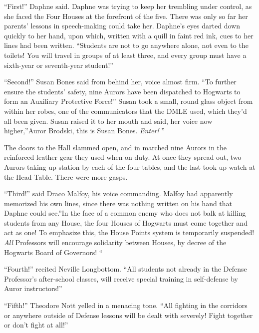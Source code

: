 ``First!'' Daphne said. Daphne was trying to keep her trembling under
control, as she faced the Four Houses at the forefront of the five.
There was only so far her parents' lessons in speech-making could take
her. Daphne's eyes darted down quickly to her hand, upon which, written
with a quill in faint red ink, cues to her lines had been written.
``Students are not to go anywhere alone, not even to the toilets! You
will travel in groups of at least three, and every group must have a
sixth-year or seventh-year student!''

``Second!'' Susan Bones said from behind her, voice almost firm. ``To
further ensure the students' safety, nine Aurors have been dispatched to
Hogwarts to form an Auxiliary Protective Force!'' Susan took a small,
round glass object from within her robes, one of the communicators that
the DMLE used, which they'd all been given. Susan raised it to her mouth
and said, her voice now higher,''Auror Brodski, this is Susan Bones.
\emph{Enter!} ''

The doors to the Hall slammed open, and in marched nine Aurors in the
reinforced leather gear they used when on duty. At once they spread out,
two Aurors taking up station by each of the four tables, and the last
took up watch at the Head Table. There were more gasps.

``Third!'' said Draco Malfoy, his voice commanding. Malfoy had
apparently memorized his own lines, since there was nothing written on
his hand that Daphne could see.''In the face of a common enemy who does
not balk at killing students from any House, the four Houses of Hogwarts
must come together and act as one! To emphasize this, the House Points
system is temporarily suspended! \emph{All} Professors will encourage
solidarity between Houses, by decree of the Hogwarts Board of Governors!
``

``Fourth!'' recited Neville Longbottom. ``All students not already in
the Defense Professor's after-school classes, will receive special
training in self-defense by Auror instructors!''

``Fifth!'' Theodore Nott yelled in a menacing tone. ``All fighting in
the corridors or anywhere outside of Defense lessons will be dealt with
severely! Fight together or don't fight at all!''

